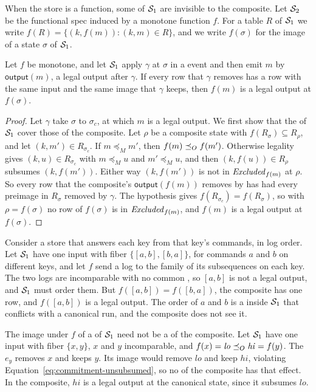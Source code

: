 When the store is a function, some \commitments of $\mathcal{S}_1$ are invisible to
the composite.  Let $\mathcal{S}_2$ be the functional spec induced by a monotone
function $f$.  For a table $R$ of $\mathcal{S}_1$ we write
$f(R)=\{(k,f(m)):(k,m)\in R\}$, and we write $f(\sigma)$ for the image of a
state $\sigma$ of $\mathcal{S}_1$.

\begin{proposition}
\label{prop:invisible-coordination}
Let $f$ be monotone, and let $\mathcal{S}_1$ apply $\gamma$ at $\sigma$ in a
\commitment event and then emit $m$ by $\mathsf{output}(m)$, a legal output
after $\gamma$.  If every row that $\gamma$ removes has a row with the same
input and the same image that $\gamma$ keeps, then $f(m)$ is a legal output at
$f(\sigma)$.
\end{proposition}

\begin{proof}
Let $\gamma$ take $\sigma$ to $\sigma_c$, at which $m$ is a legal output.  We
first show that the \commitments of $\mathcal{S}_1$ cover those of the composite.
Let $\rho$ be a composite state with $f(R_\sigma)\subseteq R_\rho$, and let
$(k,m')\in R_{\sigma_c}$.  If $m\preceq_M m'$, then $f(m)\preceq_O f(m')$.
Otherwise legality gives $(k,u)\in R_{\sigma_c}$ with $m\preceq_M u$ and
$m'\preceq_M u$, and then $(k,f(u))\in R_\rho$ subsumes $(k,f(m'))$.  Either
way $(k,f(m'))$ is not in $\mathit{Excluded}_{f(m)}$ at $\rho$.  So every row that the
composite's $\mathsf{output}(f(m))$ removes by \commitment has had every
preimage in $R_\sigma$ removed by $\gamma$.  The hypothesis gives
$f(R_{\sigma_c})=f(R_\sigma)$, so with $\rho=f(\sigma)$ no row of $f(\sigma)$
is in $\mathit{Excluded}_{f(m)}$, and $f(m)$ is a legal output at $f(\sigma)$.
\end{proof}

Consider a store that answers each key from that key's commands, in log
order.  Let $\mathcal{S}_1$ have one input with fiber $\{[a,b],[b,a]\}$, for
commands $a$ and $b$ on different keys, and let $f$ send a log to the family
of its subsequences on each key.  The two logs are incomparable with no common
\outnoun, so $[a,b]$ is not a legal output, and $\mathcal{S}_1$ must order them.
But $f([a,b])=f([b,a])$, the composite has one row, and $f([a,b])$ is a legal
output.  The order of $a$ and $b$ is a \commitment inside $\mathcal{S}_1$ that
conflicts with a canonical run, and the composite does not see it.

The image under $f$ of a \commitment of $\mathcal{S}_1$ need not be a \commitment
of the composite.  Let $\mathcal{S}_1$ have one input with fiber $\{x,y\}$, $x$ and
$y$ incomparable, and $f(x)=\mathit{lo}\preceq_O\mathit{hi}=f(y)$.  The
\commitment $e_y$ removes $x$ and keeps $y$.  Its image would remove
$\mathit{lo}$ and keep $\mathit{hi}$, violating
Equation~\ref{eq:commitment-unsubsumed}, so no \commitment of the composite
has that effect.  In the composite, $\mathit{hi}$ is a legal output at the
canonical state, since it subsumes $\mathit{lo}$.


